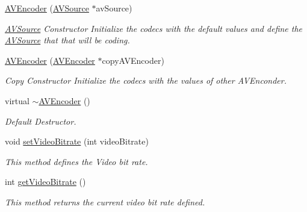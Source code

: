 \begin{DoxyCompactItemize}
\item 
\hyperlink{classbr_1_1ufscar_1_1lince_1_1streaming_1_1AVEncoder_a49570dbdfceb009b74051df252f4dc35}{AVEncoder} (\hyperlink{classbr_1_1ufscar_1_1lince_1_1streaming_1_1AVSource}{AVSource} $\ast$avSource)
\begin{DoxyCompactList}\small\item\em \hyperlink{classbr_1_1ufscar_1_1lince_1_1streaming_1_1AVSource}{AVSource} Constructor Initialize the codecs with the default values and define the \hyperlink{classbr_1_1ufscar_1_1lince_1_1streaming_1_1AVSource}{AVSource} that that will be coding. \item\end{DoxyCompactList}\item 
\hyperlink{classbr_1_1ufscar_1_1lince_1_1streaming_1_1AVEncoder_adf32dac88bc1e811c035c6f10c01922a}{AVEncoder} (\hyperlink{classbr_1_1ufscar_1_1lince_1_1streaming_1_1AVEncoder}{AVEncoder} $\ast$copyAVEncoder)
\begin{DoxyCompactList}\small\item\em Copy Constructor Initialize the codecs with the values of other AVEnconder. \item\end{DoxyCompactList}\item 
virtual \hyperlink{classbr_1_1ufscar_1_1lince_1_1streaming_1_1AVEncoder_a59a61a954519164050cd6a6344434ef9}{$\sim$AVEncoder} ()
\begin{DoxyCompactList}\small\item\em Default Destructor. \item\end{DoxyCompactList}\item 
void \hyperlink{classbr_1_1ufscar_1_1lince_1_1streaming_1_1AVEncoder_aa2d859ee4c5389f7d2b887722731b143}{setVideoBitrate} (int videoBitrate)
\begin{DoxyCompactList}\small\item\em This method defines the Video bit rate. \item\end{DoxyCompactList}\item 
int \hyperlink{classbr_1_1ufscar_1_1lince_1_1streaming_1_1AVEncoder_af06bbe7c21183f6630ad5db9084a207e}{getVideoBitrate} ()
\begin{DoxyCompactList}\small\item\em This method returns the current video bit rate defined. \item\end{DoxyCompactList}\item 

\end{DoxyCompactItemize}

